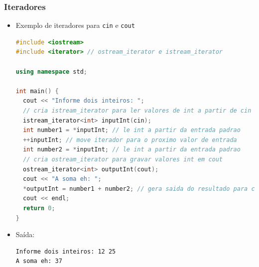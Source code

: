 \documentclass[xcolor={dvipsnames,table},aspectratio=169]{beamer}
\begin{document}
\begin{frame}[fragile]\frametitle{Iteradores}
\begin{itemize}
	\item Exemplo de iteradores para \texttt{cin} e \texttt{cout}
\begin{lstlisting}[language=C++,basicstyle=\ttfamily\tiny]
#include <iostream>
#include <iterator> // ostream_iterator e istream_iterator

using namespace std;

int main() {
  cout << "Informe dois inteiros: ";
  // cria istream_iterator para ler valores de int a partir de cin
  istream_iterator<int> inputInt(cin);
  int number1 = *inputInt; // le int a partir da entrada padrao
  ++inputInt; // move iterador para o proximo valor de entrada
  int number2 = *inputInt; // le int a partir da entrada padrao
  // cria ostream_iterator para gravar valores int em cout
  ostream_iterator<int> outputInt(cout);
  cout << "A soma eh: ";
  *outputInt = number1 + number2; // gera saida do resultado para cout
  cout << endl;
  return 0;
}
\end{lstlisting}
	\item Saída:
\begin{lstlisting}[language={},basicstyle=\ttfamily\tiny]
Informe dois inteiros: 12 25
A soma eh: 37
\end{lstlisting}
\end{itemize}
\end{frame}
\end{document}
